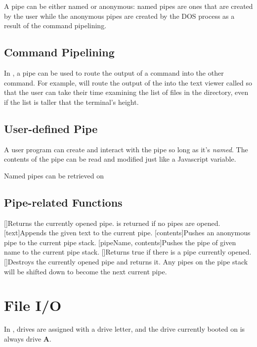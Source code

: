 A pipe can be either named or anonymous: named pipes are ones that are created by the user while the anonymous pipes are created by the DOS process as a result of the command pipelining.

\section{Command Pipelining}

In \thedos, a pipe can be used to route the output of a command into the other command. For example,  will route the output of the  into the text viewer called  so that the user can take their time examining the list of files in the directory, even if the list is taller that the terminal's height.

\section{User-defined Pipe}

A user program can create and interact with the pipe so long as it's \emph{named}. The contents of the pipe can be read and modified just like a Javascript variable.

Named pipes can be retrieved on 

\section{Pipe-related Functions}

\begin{outline}
\1[]{Returns the currently opened pipe.  is returned if no pipes are opened.}
\1[text]{Appends the given text to the current pipe.}
\1[contents]{Pushes an anonymous pipe to the current pipe stack.}
\1[pipeName, contents]{Pushes the pipe of given name to the current pipe stack.}
\1[]{Returns true if there is a pipe currently opened.}
\1[]{Destroys the currently opened pipe and returns it. Any pipes on the pipe stack will be shifted down to become the next current pipe.}
\end{outline}


\chapter{File I/O}
In \thedos, drives are assigned with a drive letter, and the drive currently booted on is always drive \textbf{A}.


